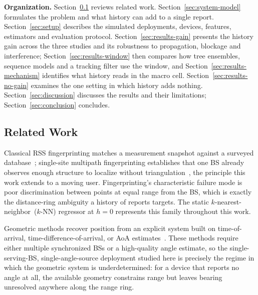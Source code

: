 \noindent\textbf{Organization.} Section~\ref{sec:related-work} reviews related work. Section~\ref{sec:system-model} formulates the problem and what history can add to a single report. Section~\ref{sec:setup} describes the simulated deployments, devices, features, estimators and evaluation protocol. Section~\ref{sec:results-gain} presents the history gain across the three studies and its robustness to propagation, blockage and interference; Section~\ref{sec:results-window} then compares how tree ensembles, sequence models and a tracking filter use the window, and Section~\ref{sec:results-mechanism} identifies what history reads in the macro cell. Section~\ref{sec:results-no-gain} examines the one setting in which history adds nothing. Section~\ref{sec:discussion} discusses the results and their limitations; Section~\ref{sec:conclusion} concludes.


\subsection{Related Work}
\label{sec:related-work}

Classical RSS fingerprinting matches a measurement snapshot against a surveyed database~\cite{yang2013_rssitocsi}; single-site multipath fingerprinting establishes that one BS already observes enough structure to localize without triangulation~\cite{kupershtein2013}, the principle this work extends to a moving user. Fingerprinting's characteristic failure mode is poor discrimination between points at equal range from the BS, which is exactly the distance-ring ambiguity a history of reports targets.
The static $k$-nearest-neighbor~($k$-NN) regressor at $h=0$ represents this family throughout this work. %

Geometric methods recover position from an explicit system built on time-of-arrival, time-difference-of-arrival, or AoA estimates~\cite{italiano2025tutorial}.
These methods require either multiple synchronized BSs or a high-quality angle estimate, so the single-serving-BS, single-angle-source deployment studied here is precisely the regime in which the geometric system is underdetermined: for a device that reports no angle at all, the available geometry constrains range but leaves bearing unresolved anywhere along the range ring.

